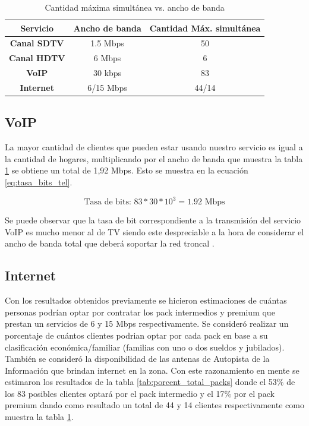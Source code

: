 \documentclass[11pt,a4paper]{article}
\begin{document}
\begin{table}[htbp]
  \centering
    \begin{tabular}{|c|c|c|}
        \hline 
        \textbf{Servicio} & \textbf{Ancho de banda} & \textbf{Cantidad Máx. simultánea} \\ \hline 
        \textbf{Canal SDTV} & 1.5 Mbps & 50 \\ \hline 
        \textbf{Canal HDTV} & 6 Mbps & 6 \\ \hline 
        \textbf{VoIP} & 30 kbps & 83 \\ \hline 
        \textbf{Internet} & 6/15 Mbps & 44/14 \\ \hline 
    \end{tabular}
  \caption{Cantidad máxima simultánea vs. ancho de banda}
  \label{tab:tv_maxima}%
\end{table}%


\subsection{VoIP}

La mayor cantidad de clientes que pueden estar usando nuestro servicio es igual a la cantidad de hogares, multiplicando por el ancho de banda que muestra la tabla \ref{tab:tv_maxima} se obtiene un total de 1,92 Mbps. Esto se muestra en la ecuación \ref{eq:tasa_bits_tel}.

\begin{equation}
    \text{Tasa de bits: } 83*30*10^3=1.92 \text{ Mbps}
    \label{eq:tasa_bits_tel}
\end{equation}

Se puede observar que la tasa de bit correspondiente a la transmisión del servicio VoIP es mucho menor al de TV siendo este despreciable a la hora de considerar el ancho de banda total que deberá soportar la red troncal .

\subsection{Internet}
Con los resultados obtenidos previamente se hicieron estimaciones de cuántas personas podrían optar por contratar los pack intermedios y premium que prestan un servicios de 6 y 15 Mbps respectivamente. 
Se consideró realizar un porcentaje de cuántos clientes podrian optar por cada pack en base a su clasificación económica/familiar (familias con uno o dos sueldos y jubilados).
También se consideró la disponibilidad de las antenas de Autopista de la Información que brindan internet en la zona. 
Con este razonamiento en mente se estimaron los resultados de la tabla \ref{tab:porcent_total_packs} donde el 53\% de los 83 posibles clientes optará por el pack intermedio y el 17\% por el pack premium dando como resultado un total de 44 y 14 clientes respectivamente como muestra la tabla \ref{tab:tv_maxima}. 
\end{document}
